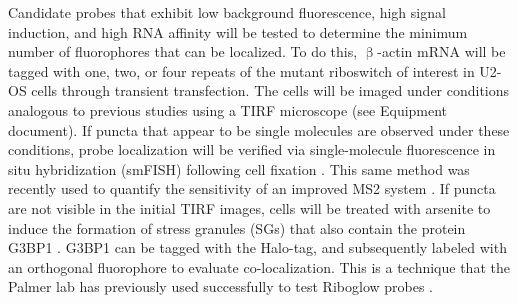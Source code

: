 Candidate probes that exhibit low background fluorescence, high signal induction, and high RNA affinity will be tested to determine the minimum number of fluorophores that can be localized. To do this, $\upbeta$-actin mRNA will be tagged with one, two, or four repeats of the mutant riboswitch of interest in U2-OS cells through transient transfection. The cells will be imaged under conditions analogous to previous studies \cite{KatzMappingtranslationhotspots2016} using a TIRF microscope (see Equipment document). If puncta that appear to be single molecules are observed under these conditions, probe localization will be verified via single-molecule fluorescence in situ hybridization (smFISH) following cell fixation \cite{MuellerFISHquantautomaticcounting2013}. This same method was recently used to quantify the sensitivity of an improved MS2 system \cite{TutucciimprovedMS2system2018}. If puncta are not visible in the initial TIRF images, cells will be treated with arsenite to induce the formation of stress granules (SGs) that also contain the protein G3BP1 \cite{ZurlaCharacterizingmRNAInteractions2011,JainATPaseModulatedStressGranules2016,NellesProgrammableRNATracking2016}.
G3BP1 can be tagged with the Halo-tag, and subsequently labeled with an orthogonal fluorophore to evaluate co-localization. This is a technique that the Palmer lab has previously used successfully to test Riboglow probes \cite{Braselmannmulticolorriboswitchbasedplatform2018}.


